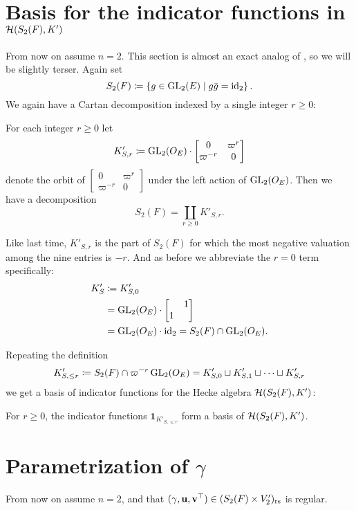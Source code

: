 \section{Basis for the indicator functions in $\mathcal H(S_2(F), K')$}
From now on assume $n = 2$.
This section is almost an exact analog of ,
so we will be slightly terser.
Again set
\[ S_2(F) \coloneqq \left\{ g \in \operatorname{GL}_2(E) \mid g \bar{g} = \operatorname{id}_2 \right\}. \]
We again have a Cartan decomposition indexed by a single integer $r \ge 0$:
\begin{lemma}
  For each integer $r \ge 0$ let
  \[ K'_{S,r} \coloneqq \operatorname{GL}_2(O_E) \cdot
    \begin{bmatrix} 0 & \varpi^r \\ \varpi^{-r} & 0 \end{bmatrix} \]
  denote the orbit of
  $\begin{bmatrix} 0 & \varpi^r \\ \varpi^{-r} & 0 \end{bmatrix}$
  under the left action of $\operatorname{GL}_2(O_E)$.
  Then we have a decomposition
  \[ S_2(F) = \coprod_{r \geq 0} K'_{S,r}. \]
\end{lemma}
Like last time, $K'_{S,r}$ is the part of $S_2(F)$
for which the most negative valuation among the nine entries is $-r$.
And as before we abbreviate the $r = 0$ term specifically:
\begin{align*}
  K'_S
  &\coloneqq K'_{S,0} \\
  &= \operatorname{GL}_2(O_E) \cdot \begin{bmatrix} & 1 \\ 1 \end{bmatrix} \\
  &= \operatorname{GL}_2(O_E) \cdot \operatorname{id}_2 = S_2(F) \cap \operatorname{GL}_2(O_E).
\end{align*}

Repeating the definition
\[ K'_{S, \le r} \coloneqq S_2(F) \cap \varpi^{-r} \operatorname{GL}_2(O_E)
  = K'_{S,0} \sqcup K'_{S,1} \sqcup \dots \sqcup K'_{S,r} \]
we get a basis of indicator functions for the Hecke algebra $\mathcal H(S_2(F), K')$:
\begin{proposition}
  For $r \ge 0$, the indicator functions $\mathbf{1}_{K'_{S, \le r}}$
  form a basis of $\mathcal H(S_2(F), K')$.
\end{proposition}

\section{Parametrization of $\gamma$}
From now on assume $n = 2$,
and that $(\gamma, \mathbf u, \mathbf v^\top) \in (S_2(F) \times V'_2)_{\mathrm{rs}}$ is regular.


